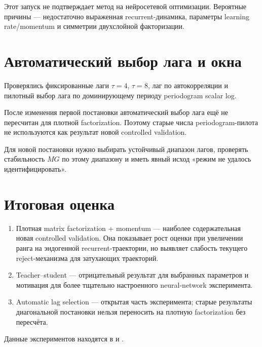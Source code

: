 ﻿\documentclass[11pt,a4paper]{article}
\newcommand{\code}[1]{\path{#1}}
\begin{document}
Этот запуск не подтверждает метод на нейросетевой оптимизации. Вероятные причины --- недостаточно выраженная recurrent-динамика, параметры learning rate/momentum и симметрии двухслойной факторизации.

\section{Автоматический выбор лага и окна}

Проверялись фиксированные лаги $\tau=4$, $\tau=8$, лаг по автокорреляции и пилотный выбор лага по доминирующему периоду periodogram scalar log.

После изменения первой постановки автоматический выбор лага ещё не пересчитан для плотной factorization. Поэтому старые числа periodogram-пилота не используются как результат новой controlled validation.

Для новой постановки нужно выбирать устойчивый диапазон лагов, проверять стабильность $MG$ по этому диапазону и иметь явный исход «режим не удалось идентифицировать».

\section*{Итоговая оценка}

\begin{enumerate}
  \item Плотная matrix factorization + momentum --- наиболее содержательная новая controlled validation. Она показывает рост оценки при увеличении ранга на эндогенной recurrent-траектории, но выявляет слабость текущего reject-механизма для затухающих траекторий.
  \item Teacher--student --- отрицательный результат для выбранных параметров и мотивация для более тщательно настроенного neural-network эксперимента.
  \item Automatic lag selection --- открытая часть эксперимента; старые результаты диагональной постановки нельзя переносить на плотную factorization без пересчёта.
\end{enumerate}

Данные экспериментов находятся в \code{raw\_scores.csv} и \code{summary.csv}.
\end{document}
